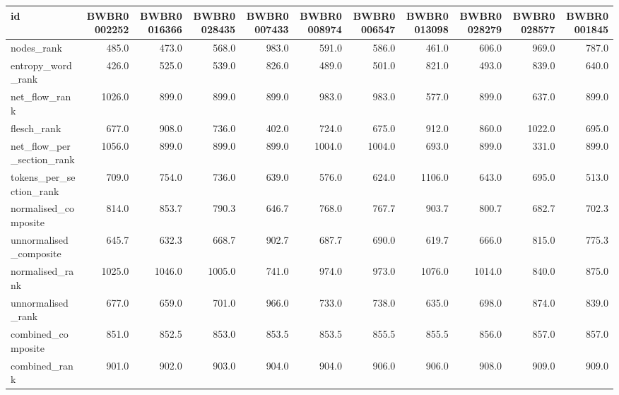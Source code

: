 \begin{tabular}{lrrrrrrrrrr}
\toprule
id & BWBR0002252 & BWBR0016366 & BWBR0028435 & BWBR0007433 & BWBR0008974 & BWBR0006547 & BWBR0013098 & BWBR0028279 & BWBR0028577 & BWBR0001845 \\
\midrule
nodes\_rank & 485.0 & 473.0 & 568.0 & 983.0 & 591.0 & 586.0 & 461.0 & 606.0 & 969.0 & 787.0 \\
\cline{1-11}
entropy\_word\_rank & 426.0 & 525.0 & 539.0 & 826.0 & 489.0 & 501.0 & 821.0 & 493.0 & 839.0 & 640.0 \\
\cline{1-11}
net\_flow\_rank & 1026.0 & 899.0 & 899.0 & 899.0 & 983.0 & 983.0 & 577.0 & 899.0 & 637.0 & 899.0 \\
\cline{1-11}
flesch\_rank & 677.0 & 908.0 & 736.0 & 402.0 & 724.0 & 675.0 & 912.0 & 860.0 & 1022.0 & 695.0 \\
\cline{1-11}
net\_flow\_per\_section\_rank & 1056.0 & 899.0 & 899.0 & 899.0 & 1004.0 & 1004.0 & 693.0 & 899.0 & 331.0 & 899.0 \\
\cline{1-11}
tokens\_per\_section\_rank & 709.0 & 754.0 & 736.0 & 639.0 & 576.0 & 624.0 & 1106.0 & 643.0 & 695.0 & 513.0 \\
\cline{1-11}
normalised\_composite & 814.0 & 853.7 & 790.3 & 646.7 & 768.0 & 767.7 & 903.7 & 800.7 & 682.7 & 702.3 \\
\cline{1-11}
unnormalised\_composite & 645.7 & 632.3 & 668.7 & 902.7 & 687.7 & 690.0 & 619.7 & 666.0 & 815.0 & 775.3 \\
\cline{1-11}
normalised\_rank & 1025.0 & 1046.0 & 1005.0 & 741.0 & 974.0 & 973.0 & 1076.0 & 1014.0 & 840.0 & 875.0 \\
\cline{1-11}
unnormalised\_rank & 677.0 & 659.0 & 701.0 & 966.0 & 733.0 & 738.0 & 635.0 & 698.0 & 874.0 & 839.0 \\
\cline{1-11}
combined\_composite & 851.0 & 852.5 & 853.0 & 853.5 & 853.5 & 855.5 & 855.5 & 856.0 & 857.0 & 857.0 \\
\cline{1-11}
combined\_rank & 901.0 & 902.0 & 903.0 & 904.0 & 904.0 & 906.0 & 906.0 & 908.0 & 909.0 & 909.0 \\
\cline{1-11}
\bottomrule
\end{tabular}
